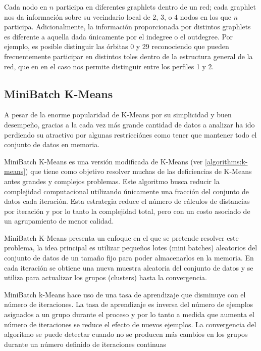 Cada nodo en $n$ participa en diferentes graphlets dentro de un red; cada graphlet nos da información sobre su vecindario local de 2, 3, o 4 nodos en los que $n$ participa. Adicionalmente, la información proporcionada por distintos graphlets es diferente a aquella dada únicamente por el indegree o el outdegree. Por ejemplo, es posible distinguir las órbitas 0 y 29 reconociendo que pueden frecuentemente participar en distintos toles dentro de la estructura general de la red, que en en el caso nos permite distinguir entre los perfiles 1 y 2.

\subsection{MiniBatch K-Means}

A pesar de la enorme popularidad de K-Means por su simplicidad y buen desempeño, gracias a la cada vez más grande cantidad de datos a analizar ha ido perdiendo su atractivo por algunas restricciónes como tener que mantener todo el conjunto de datos en memoria. 

MiniBatch K-Means \cite{sculley_web-scale_2010} es una versión modificada de K-Means (ver \ref{algorithms:k-means}) que tiene como objetivo resolver muchas de las deficiencias de K-Means antes grandes y complejos problemas. Este algoritmo busca reducir la complejidad computacional utilizando únicamente una fracción del conjunto de datos cada iteración. Esta estrategia reduce el número de cálculos de distancias por iteración y por lo tanto la complejidad total, pero con un costo asociado de un agrupamiento de menor calidad. \cite{bejar_k-means_nodate}

MiniBatch K-Means presenta un enfoque en el que se pretende resolver este problema, la idea principal es utilizar pequeños lotes (mini batches) aleatorios del conjunto de datos de un tamaño fijo para poder almacenarlos en la memoria. En cada iteración se obtiene una nueva muestra aleatoria del conjunto de datos y se utiliza para actualizar los grupos (clusters) hasta la convergencia. 

MiniBatch k-Means hace uso de una tasa de aprendizaje que disminuye con el número de iteraciones. La tasa de aprendizaje es inversa del número de ejemplos asignados a un grupo durante el proceso y por lo tanto a medida que aumenta el número de iteraciones se reduce el efecto de nuevos ejemplos. La convergencia del algoritmo se puede detectar cuando no se producen más cambios en los grupos durante un número definido de iteraciones continuas


